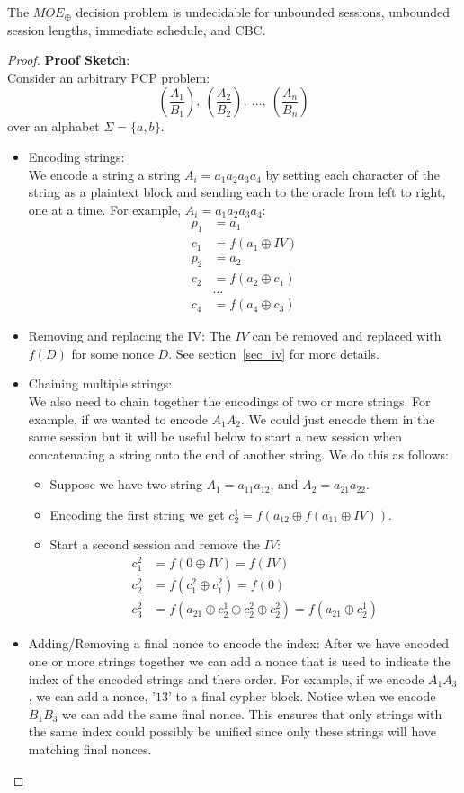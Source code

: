 \documentclass{llncs}
\begin{document}
\begin{theorem}\label{thm:unbounded_unbounded}
The $MOE_{\oplus}$ decision problem is undecidable for unbounded 
sessions, unbounded session lengths, immediate schedule, and CBC. 
\end{theorem}
\begin{proof}
\textbf{Proof Sketch}:\\
Consider an arbitrary PCP problem:
\[
(\frac{A_1}{B_1}),~(\frac{A_2}{B_2}), ~\ldots, ~(\frac{A_n}{B_n})
\]
over an alphabet $\Sigma=\{a, b\}$. 
\begin{itemize}
	\item Encoding strings:\\ 
	We encode a string a string $A_i = a_1 a_2 a_3 a_4$ by 
	setting each character of the string as a plaintext block 
	and sending each to the oracle from left to right, one at a 
	time. For example,  $A_i = a_1 a_2 a_3 a_4$:
	\begin{align*}
	p_1 &=a_1\\
	c_1 &=f(a_1 \oplus IV)\\
	p_2 &=a_2\\
	c_2 &=f(a_2 \oplus c_1)\\
	&\ldots\\
	c_4 &=f(a_4 \oplus c_3)
	\end{align*}
	\item Removing and replacing the IV:
	The $IV$ can be removed and replaced with $f(D)$ for 
	some nonce $D$. See section~\ref{sec_iv} for more details.
	\item Chaining multiple strings:\\
	We also need to chain together the encodings of two or more strings. For example, if we wanted to encode $A_1A_2$. We
	could just encode them in the same session but it will be
	useful below to start a new session when concatenating 
	a string onto the end of another string. We do this as 
	follows:
	\begin{itemize}
		\item Suppose we have two string $A_1 = a_{11}a_{12}$, and 
		$A_2 =a_{21}a_{22}$.
		\item Encoding the first string we get 
		$c^1_2 = f(a_{12} \oplus f(a_{11}\oplus IV))$.
		\item Start a second session and remove the $IV$:
		\begin{align*}
		c^2_1 &= f(0 \oplus IV) = f(IV)\\
		c^2_2 &= f(c^2_1 \oplus c^2_1) = f(0)\\
		c^2_3 &= f(a_{21} \oplus c^1_2 \oplus c^2_2 \oplus c^2_2) =
		f(a_{21} \oplus c^1_2)
		\end{align*}
	\end{itemize} 
	\item Adding/Removing a final nonce to encode the index:
	After we have encoded one or more strings together we can 
	add a nonce that is used to indicate the index of the encoded
	strings and there order. For example, if we encode $A_1A_3$, 
	we can add a nonce, '$13$' to a final cypher block. Notice
	when we encode $B_1B_3$ we can add the same final nonce. This
	ensures that only strings with the same index could possibly 
	be unified since only these strings will have matching final 
	nonces. 
	

\end{itemize}
\end{proof}
\end{document}

